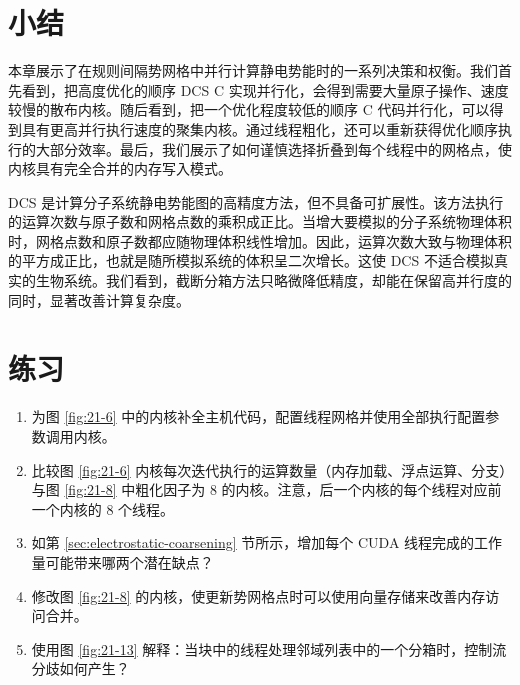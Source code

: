 \section{小结}
\label{sec:electrostatic-summary}

本章展示了在规则间隔势网格中并行计算静电势能时的一系列决策和权衡。我们首先看到，把高度优化的顺序 DCS C 实现并行化，会得到需要大量原子操作、速度较慢的散布内核。随后看到，把一个优化程度较低的顺序 C 代码并行化，可以得到具有更高并行执行速度的聚集内核。通过线程粗化，还可以重新获得优化顺序执行的大部分效率。最后，我们展示了如何谨慎选择折叠到每个线程中的网格点，使内核具有完全合并的内存写入模式。

DCS 是计算分子系统静电势能图的高精度方法，但不具备可扩展性。该方法执行的运算次数与原子数和网格点数的乘积成正比。当增大要模拟的分子系统物理体积时，网格点数和原子数都应随物理体积线性增加。因此，运算次数大致与物理体积的平方成正比，也就是随所模拟系统的体积呈二次增长。这使 DCS 不适合模拟真实的生物系统。我们看到，截断分箱方法只略微降低精度，却能在保留高并行度的同时，显著改善计算复杂度。

\section{练习}
\label{sec:electrostatic-exercises}

\begin{enumerate}[label=\arabic*.,leftmargin=2.7em]
  \item 为图 \ref{fig:21-6} 中的内核补全主机代码，配置线程网格并使用全部执行配置参数调用内核。

  \item 比较图 \ref{fig:21-6} 内核每次迭代执行的运算数量（内存加载、浮点运算、分支）与图 \ref{fig:21-8} 中粗化因子为 8 的内核。注意，后一个内核的每个线程对应前一个内核的 8 个线程。

  \item 如第 \ref{sec:electrostatic-coarsening} 节所示，增加每个 CUDA 线程完成的工作量可能带来哪两个潜在缺点？

  \item 修改图 \ref{fig:21-8} 的内核，使更新势网格点时可以使用向量存储来改善内存访问合并。

  \item 使用图 \ref{fig:21-13} 解释：当块中的线程处理邻域列表中的一个分箱时，控制流分歧如何产生？
\end{enumerate}

